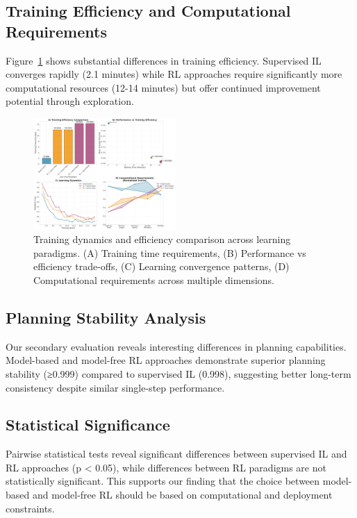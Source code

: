 \documentclass[conference]{IEEEtran}
\begin{document}
\subsection{Training Efficiency and Computational Requirements}

Figure~\ref{fig:training_dynamics} shows substantial differences in training efficiency. Supervised IL converges rapidly (2.1 minutes) while RL approaches require significantly more computational resources (12-14 minutes) but offer continued improvement potential through exploration.

\begin{figure}[htbp]
\centering
\includegraphics[width=0.48\textwidth]{figures/training_dynamics.png}
\caption{Training dynamics and efficiency comparison across learning paradigms. (A) Training time requirements, (B) Performance vs efficiency trade-offs, (C) Learning convergence patterns, (D) Computational requirements across multiple dimensions.}
\label{fig:training_dynamics}
\end{figure}

\subsection{Planning Stability Analysis}

Our secondary evaluation reveals interesting differences in planning capabilities. Model-based and model-free RL approaches demonstrate superior planning stability (≥0.999) compared to supervised IL (0.998), suggesting better long-term consistency despite similar single-step performance.

\subsection{Statistical Significance}

Pairwise statistical tests reveal significant differences between supervised IL and RL approaches (p < 0.05), while differences between RL paradigms are not statistically significant. This supports our finding that the choice between model-based and model-free RL should be based on computational and deployment constraints.
\end{document}
